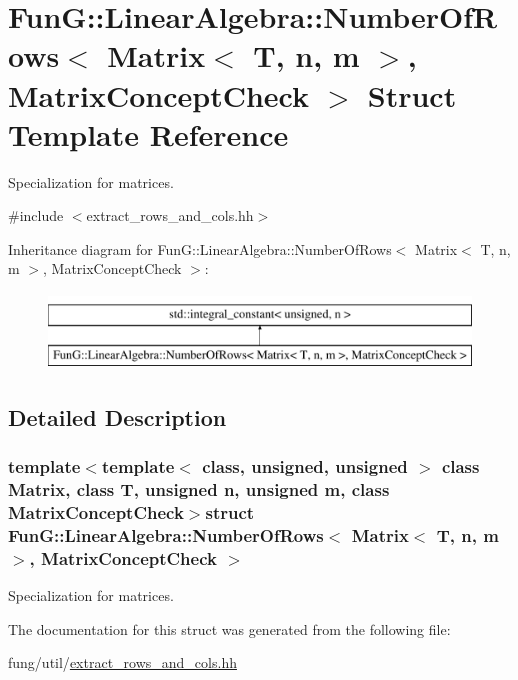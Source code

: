 \hypertarget{structFunG_1_1LinearAlgebra_1_1NumberOfRows_3_01Matrix_3_01T_00_01n_00_01m_01_4_00_01MatrixConceptCheck_01_4}{}\section{Fun\+G\+:\+:Linear\+Algebra\+:\+:Number\+Of\+Rows$<$ Matrix$<$ T, n, m $>$, Matrix\+Concept\+Check $>$ Struct Template Reference}
\label{structFunG_1_1LinearAlgebra_1_1NumberOfRows_3_01Matrix_3_01T_00_01n_00_01m_01_4_00_01MatrixConceptCheck_01_4}


Specialization for matrices.  




{\ttfamily \#include $<$extract\+\_\+rows\+\_\+and\+\_\+cols.\+hh$>$}

Inheritance diagram for Fun\+G\+:\+:Linear\+Algebra\+:\+:Number\+Of\+Rows$<$ Matrix$<$ T, n, m $>$, Matrix\+Concept\+Check $>$\+:\begin{figure}[H]
\begin{center}
\leavevmode
\includegraphics[height=2.000000cm]{structFunG_1_1LinearAlgebra_1_1NumberOfRows_3_01Matrix_3_01T_00_01n_00_01m_01_4_00_01MatrixConceptCheck_01_4}
\end{center}
\end{figure}


\subsection{Detailed Description}
\subsubsection*{template$<$template$<$ class, unsigned, unsigned $>$ class Matrix, class T, unsigned n, unsigned m, class Matrix\+Concept\+Check$>$struct Fun\+G\+::\+Linear\+Algebra\+::\+Number\+Of\+Rows$<$ Matrix$<$ T, n, m $>$, Matrix\+Concept\+Check $>$}

Specialization for matrices. 

The documentation for this struct was generated from the following file\+:\begin{DoxyCompactItemize}
\item 
fung/util/\hyperlink{extract__rows__and__cols_8hh}{extract\+\_\+rows\+\_\+and\+\_\+cols.\+hh}\end{DoxyCompactItemize}
